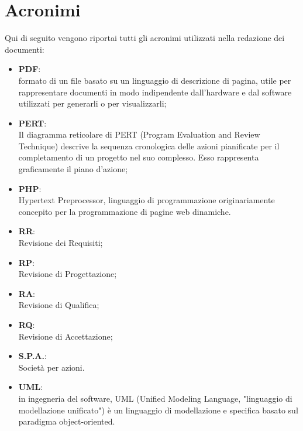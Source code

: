 \section{Acronimi}
Qui di seguito vengono riportai tutti gli acronimi utilizzati nella redazione dei documenti:
\begin{itemize}
\item \textbf{PDF}:\\ formato di un file basato su un linguaggio di descrizione di pagina, utile per rappresentare documenti in modo indipendente dall'hardware e dal software utilizzati per generarli o per visualizzarli;
\item \textbf{PERT}:\\ Il diagramma reticolare di PERT (Program Evaluation and Review Technique) descrive la sequenza cronologica delle azioni pianificate per il completamento di un progetto nel suo complesso. Esso rappresenta graficamente il piano d’azione;
\item \textbf{PHP}:\\ Hypertext Preprocessor, linguaggio di programmazione originariamente concepito per la programmazione di pagine web dinamiche.
\item \textbf{RR}:\\ Revisione dei Requisiti;
\item \textbf{RP}:\\ Revisione di Progettazione;
\item \textbf{RA}:\\ Revisione di Qualifica;
\item \textbf{RQ}:\\ Revisione di Accettazione;
\item \textbf{S.P.A.}:\\ Società per azioni.
\item \textbf{UML}:\\ in ingegneria del software, UML (Unified Modeling Language, "linguaggio di modellazione unificato") è un linguaggio di modellazione e specifica basato sul paradigma object-oriented.
\end{itemize}